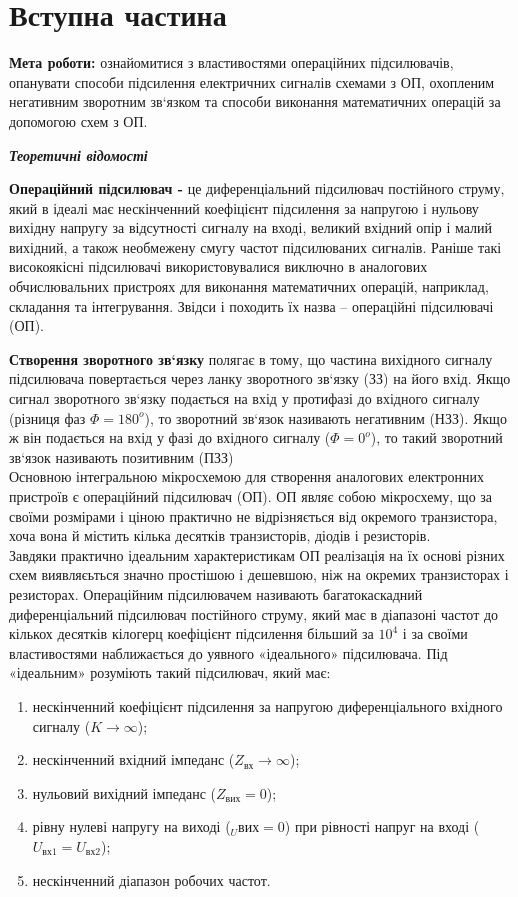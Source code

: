 \section{Вступна частина}
\setlength{\parindent}{4em}
\indent \textbf{Мета роботи:} ознайомитися з властивостями операційних
підсилювачів, опанувати способи підсилення електричних сигналів схемами з
ОП, охопленим негативним зворотним зв`язком та способи виконання
математичних операцій за допомогою схем з ОП. \par

\begin{center}
\textbf{\emph{Теоретичні відомості}}
\end{center}
\qquad \textbf{Операційний підсилювач - } це
диференціальний підсилювач постійного струму, який в ідеалі має
нескінченний коефіцієнт підсилення за напругою і нульову вихідну напругу за
відсутності сигналу на вході, великий вхідний опір і малий вихідний, а також
необмежену смугу частот підсилюваних сигналів. Раніше такі високоякісні
підсилювачі використовувалися виключно в аналогових обчислювальних
пристроях для виконання математичних операцій, наприклад, складання та
інтегрування. Звідси і походить їх назва – операційні підсилювачі (ОП).\par
\textbf{Створення зворотного зв`язку} полягає в тому, що частина вихідного
сигналу підсилювача повертається через ланку зворотного зв`язку (ЗЗ) на його
вхід. Якщо сигнал зворотного зв`язку подається на вхід у протифазі до вхідного
сигналу (різниця фаз $\Phi = 180^o$), то зворотний зв`язок називають негативним
(НЗЗ). Якщо ж він подається на вхід у фазі до вхідного сигналу
($\Phi = 0^o$), то такий зворотний зв`язок називають позитивним (ПЗЗ) \\
Основною інтегральною мікросхемою для створення аналогових
електронних пристроїв є операційний підсилювач (ОП). ОП являє собою мікросхему, що за своїми розмірами і ціною практично не відрізняється від
окремого транзистора, хоча вона й містить кілька десятків транзисторів, діодів і
резисторів.\\
Завдяки практично ідеальним характеристикам ОП реалізація на їх основі
різних схем виявляєьться значно простішою і дешевшою, ніж на окремих
транзисторах і резисторах.
Операційним підсилювачем називають багатокаскадний диференціальний
підсилювач постійного струму, який має в діапазоні частот до кількох десятків
кілогерц коефіцієнт підсилення більший за $10^4$
і за своїми властивостями
наближається до уявного «ідеального» підсилювача. Під «ідеальним»
розуміють такий підсилювач, який має:
\begin{enumerate}
  \item нескінченний коефіцієнт підсилення за напругою диференціального
вхідного сигналу ($K \to \infty$);
  \item нескінченний вхідний імпеданс ($Z_{вх} \to \infty$);
  \item  нульовий вихідний імпеданс ($Z_{вих} = 0$);
  \item  рівну нулеві напругу на виході ($_U{вих} = 0$) при рівності напруг на вході
($U_{вх1} = U_{вх2}$);
  \item нескінченний діапазон робочих частот.
\end{enumerate}

